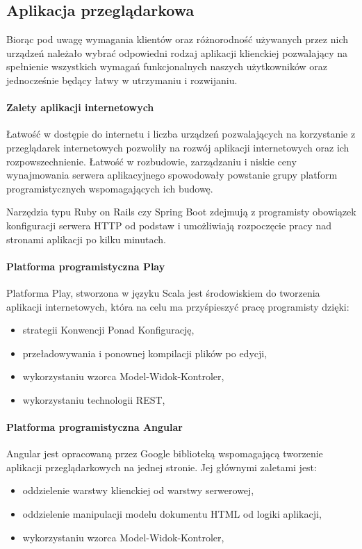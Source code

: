 \documentclass[a4paper,12pt,twoside]{article}
\begin{document}
\subsection{Aplikacja przeglądarkowa}
Biorąc pod uwagę wymagania klientów oraz różnorodność używanych przez nich urządzeń należało wybrać odpowiedni rodzaj aplikacji klienckiej pozwalający na spełnienie wszystkich wymagań funkcjonalnych naszych użytkowników
oraz jednocześnie będący łatwy w utrzymaniu i rozwijaniu.

\paragraph{Zalety aplikacji internetowych}
Łatwość w dostępie do internetu i liczba urządzeń pozwalających na
korzystanie z przeglądarek internetowych pozwoliły
na rozwój aplikacji internetowych oraz ich rozpowszechnienie.
Łatwość w rozbudowie, zarządzaniu i
niskie ceny wynajmowania serwera aplikacyjnego spowodowały
powstanie grupy platform programistycznych wspomagających ich budowę.

Narzędzia typu Ruby on Rails czy Spring Boot
zdejmują z programisty obowiązek konfiguracji serwera
HTTP od podstaw i umożliwiają rozpoczęcie pracy
nad stronami aplikacji po kilku minutach.

\paragraph{Platforma programistyczna Play}
Platforma Play, stworzona w języku Scala jest środowiskiem
do tworzenia aplikacji internetowych,
która na celu ma przyśpieszyć pracę programisty dzięki:
\begin{itemize}
\item strategii Konwencji Ponad Konfigurację,
\item przeładowywania i ponownej kompilacji plików po edycji,
\item wykorzystaniu wzorca Model-Widok-Kontroler,
\item wykorzystaniu technologii REST,
\end{itemize}

\paragraph{Platforma programistyczna Angular}
Angular jest opracowaną przez Google biblioteką wspomagającą tworzenie
aplikacji przeglądarkowych na jednej stronie. Jej głównymi zaletami jest:
\begin{itemize}
\item oddzielenie warstwy klienckiej od warstwy serwerowej,
\item oddzielenie manipulacji modelu dokumentu HTML od logiki aplikacji,
\item wykorzystaniu wzorca Model-Widok-Kontroler,
\end{itemize}
\end{document}

